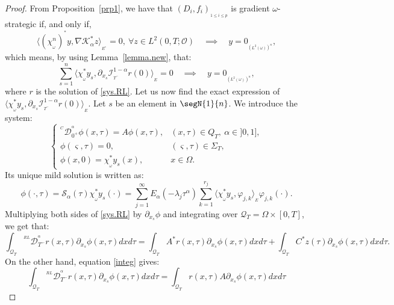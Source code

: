 \documentclass{article}
\begin{document}
\begin{proof} 
From Proposition~\ref{prp1}, we have that 
$(D_i,f_i)_{_{1\leq i\leq p}}$ is gradient $\omega$-strategic if,
and only if, 
$$
\langle\left(\chi_{_\omega}^n\right)^{^*}y, \nabla\mathcal{K}_\alpha^*z 
\rangle_{_{E^{^n}}} = 0, \ 
\forall z\in L^2(0,T;\mathcal{O}) 
\quad \implies \quad y=0_{_{\left(L^2(\omega)\right)^n}},
$$
which means, by using Lemma~\ref{lemma.new}, that:
\begin{equation}
\label{***}
\displaystyle\sum_{s=1}^{n} \langle \chi_{_\omega}^*y_s,\partial_{x_s}
\mathcal{I}^{1-\alpha}_{_{T^-}}r(0) \rangle_{_{E}} =0 
\quad \implies \quad y=0_{_{\left(L^2(\omega)\right)^n}},
\end{equation}
where $r$ is the solution of \eqref{sys.RL}. Let us now find 
the exact expression of $\langle \chi_{_\omega}^*y_s,
\partial_{x_s}\mathcal{I}^{1-\alpha}_{_{T^-}}r(0) \rangle_{_{E}}$.
Let $s$ be an element in $\segN{1}{n}$. We introduce the system:
\begin{equation}
\label{sys.prf}
\left\{\begin{array}{llll}
^{^C}\mathcal{D}_{0^+}^{^\alpha}\phi(x,\tau) 
=  A\phi(x,\tau),  & (x,\tau)\in Q_T, \ \alpha\in]0,1], \\ 
\phi(\varsigma,\tau) = 0,  & (\varsigma,\tau)\in \Sigma_T, \\
\phi(x,0) = \chi_{_\omega}^*y_s(x),  & x\in\Omega.
\end{array}\right.
\end{equation}
Its unique mild solution is written as:
$$
\phi(\cdot,\tau) = \mathcal{S}_\alpha(\tau)\chi_{_\omega}^*y_s(\cdot) 
= \displaystyle\sum_{j=1}^{\infty}
E_\alpha(-\lambda_j\tau^\alpha)\sum_{k=1}^{r_j}\langle 
\chi_{_\omega}^*y_s,\varphi_{j,k}\rangle_{_{E}}\varphi_{j,k}(\cdot).
$$
Multiplying both sides of \eqref{sys.RL} by 
$\partial_{x_s}\phi$ and integrating 
over $\mathcal{Q}_T =\Omega\times[0,T]$, we get that:
\begin{equation}
\label{prf.1}
\int_{\mathcal{Q}_T}{^{^{RL}}
\mathcal{D}_{T^-}^{^\alpha}}r(x,\tau)\partial_{x_s} \phi(x,\tau)dxd\tau 
= \int_{\mathcal{Q}_T} A^*r(x,\tau) \partial_{x_s} \phi(x,\tau)dxd\tau 
+ \int_{\mathcal{Q}_T}C^*z(\tau)\partial_{x_s} \phi(x,\tau)dxd\tau.
\end{equation}
On the other hand, equation \eqref{integ} gives:
\begin{equation}
\label{prf.2}
\int_{\mathcal{Q}_T}{^{^{RL}}\mathcal{D}_{T^-}^{^\alpha}}
r(x,\tau)\partial_{x_s} \phi(x,\tau)dxd\tau
= \int_{\mathcal{Q}_T}r(x,\tau) A\partial_{x_s} \phi(x,\tau)dxd\tau 

\end{equation}
\end{proof}
\end{document}
